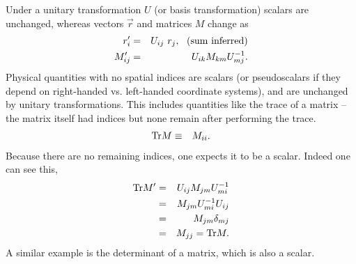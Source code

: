 Under a unitary transformation $U$ (or basis transformation) scalars are unchanged, whereas vectors $\vec{r}$ and matrices $M$ change as
\begin{eqnarray}
r'_i&=&U_{ij}~ r_j, ~~({\rm sum~inferred})\\
\nonumber
M'_{ij}&=&U_{ik}M_{km}U^{-1}_{mj}.
\end{eqnarray}
Physical quantities with no spatial indices are scalars (or pseudoscalars if they depend on right-handed vs. left-handed coordinate systems), and are unchanged by unitary transformations. This includes quantities like the trace of a matrix -- the matrix itself had indices but none remain after performing the trace.
\begin{eqnarray}
{\rm Tr} M&\equiv& M_{ii}.
\end{eqnarray}
Because there are no remaining indices, one expects it to be a scalar. Indeed one can see this,
\begin{eqnarray}
{\rm Tr} M'&=&U_{ij}M_{jm}U^{-1}_{mi}\\
\nonumber
&=&M_{jm}U^{-1}_{mi}U_{ij}\\
\nonumber
&=&M_{jm}\delta_{mj}\\
\nonumber
&=&M_{jj}={\rm Tr} M.
\end{eqnarray}
A similar example is the determinant of a matrix, which is also a scalar.

